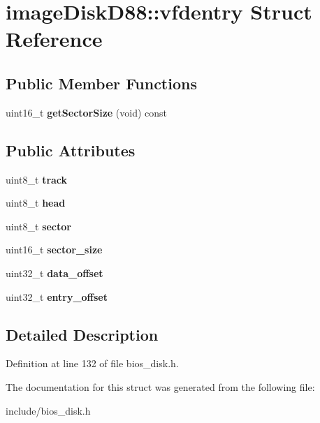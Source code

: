 \hypertarget{structimageDiskD88_1_1vfdentry}{\section{image\-Disk\-D88\-:\-:vfdentry Struct Reference}
\label{structimageDiskD88_1_1vfdentry}
}
\subsection*{Public Member Functions}
\begin{DoxyCompactItemize}
\item 
\hypertarget{structimageDiskD88_1_1vfdentry_a308243cc68ff88697a893f66c99243e5}{uint16\-\_\-t {\bfseries get\-Sector\-Size} (void) const }\label{structimageDiskD88_1_1vfdentry_a308243cc68ff88697a893f66c99243e5}

\end{DoxyCompactItemize}
\subsection*{Public Attributes}
\begin{DoxyCompactItemize}
\item 
\hypertarget{structimageDiskD88_1_1vfdentry_ab6be8861bab810343858d2b3eb2c80cd}{uint8\-\_\-t {\bfseries track}}\label{structimageDiskD88_1_1vfdentry_ab6be8861bab810343858d2b3eb2c80cd}

\item 
\hypertarget{structimageDiskD88_1_1vfdentry_a9d77966ce846181817e786de4c17f005}{uint8\-\_\-t {\bfseries head}}\label{structimageDiskD88_1_1vfdentry_a9d77966ce846181817e786de4c17f005}

\item 
\hypertarget{structimageDiskD88_1_1vfdentry_acca39005f709d218d88f31f7f4622cb4}{uint8\-\_\-t {\bfseries sector}}\label{structimageDiskD88_1_1vfdentry_acca39005f709d218d88f31f7f4622cb4}

\item 
\hypertarget{structimageDiskD88_1_1vfdentry_a38d94595d696210f20897f239fa39e44}{uint16\-\_\-t {\bfseries sector\-\_\-size}}\label{structimageDiskD88_1_1vfdentry_a38d94595d696210f20897f239fa39e44}

\item 
\hypertarget{structimageDiskD88_1_1vfdentry_a39b1b5ef8922b2b16a63d207b155d49c}{uint32\-\_\-t {\bfseries data\-\_\-offset}}\label{structimageDiskD88_1_1vfdentry_a39b1b5ef8922b2b16a63d207b155d49c}

\item 
\hypertarget{structimageDiskD88_1_1vfdentry_aa58f7c17c694ab100aa242aa90b45868}{uint32\-\_\-t {\bfseries entry\-\_\-offset}}\label{structimageDiskD88_1_1vfdentry_aa58f7c17c694ab100aa242aa90b45868}

\end{DoxyCompactItemize}


\subsection{Detailed Description}


Definition at line 132 of file bios\-\_\-disk.\-h.



The documentation for this struct was generated from the following file\-:\begin{DoxyCompactItemize}
\item 
include/bios\-\_\-disk.\-h\end{DoxyCompactItemize}
